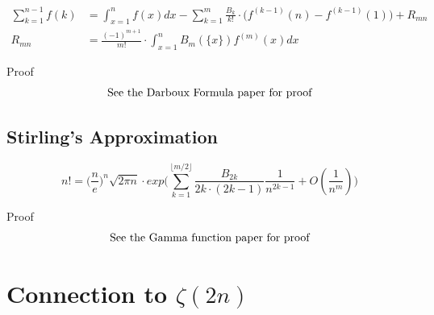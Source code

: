 \documentclass[a4paper]{article}
\begin{document}
    \begin{theorem}
        \begin{subequations}
            \label{Euler-Maclaurin formula}
            \begin{align}
                \sum_{k=1}^{n-1} f(k) &= \int_{x=1}^{n} f(x) dx -
                \sum_{k=1}^{m} \frac{B_k}{k!} \cdot \big( f^{(k-1)}(n) - f^{(k-1)}(1) \big) +
                R_{mn} \\
                R_{mn} &= \frac{(-1)^{m+1}}{m!} \cdot \int_{x=1}^{n} B_{m}(\{x\}) f^{(m)} (x) dx
            \end{align}
        \end{subequations}

        Proof
        \begin{gather*}
            \intertext{See the Darboux Formula paper for proof}
        \end{gather*}
    \end{theorem}

    \subsection{Stirling's Approximation}\label{subsec:stirling's-approximation}
    \begin{theorem}

        \begin{equation}
            n! = \Big( \frac{n}{e} \Big)^{n} \sqrt{2 \pi n} \cdot exp\Bigg(\sum_{k=1}^{\lfloor m/2 \rfloor} \frac{B_{2k}}{2k \cdot (2k-1)}  \frac{1}{n^{2k-1}} + O(\frac{1}{n^{m}})\Bigg)\label{eq:equation8}
        \end{equation}


        Proof
        \begin{gather*}
            \intertext{See the Gamma function paper for proof}
        \end{gather*}
    \end{theorem}

    \pagebreak


    \section{Connection to $\zeta(2n)$}\label{sec:connection-to-$zeta(2n)$}
\end{document}
